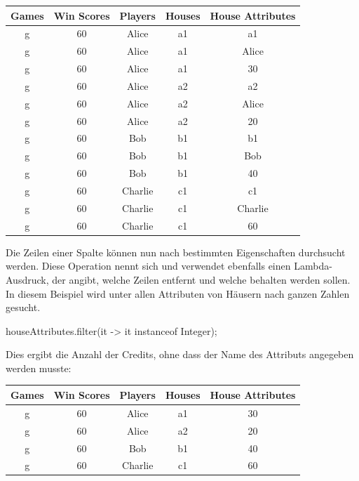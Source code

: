 \begin{tabular}{|c|c|c|c|c|}
    \hline
    \textbf{Games} & \textbf{Win Scores} & \textbf{Players} & \textbf{Houses} & \textbf{House Attributes} \\
    \hline
    g & 60 & Alice   & a1 & a1      \\
    g & 60 & Alice   & a1 & Alice   \\
    g & 60 & Alice   & a1 & 30      \\
    g & 60 & Alice   & a2 & a2      \\
    g & 60 & Alice   & a2 & Alice   \\
    g & 60 & Alice   & a2 & 20      \\
    g & 60 & Bob     & b1 & b1      \\
    g & 60 & Bob     & b1 & Bob     \\
    g & 60 & Bob     & b1 & 40      \\
    g & 60 & Charlie & c1 & c1      \\
    g & 60 & Charlie & c1 & Charlie \\
    g & 60 & Charlie & c1 & 60      \\
    \hline
\end{tabular}

Die Zeilen einer Spalte können nun nach bestimmten Eigenschaften durchsucht werden.
Diese Operation nennt sich  und verwendet ebenfalls einen Lambda-Ausdruck,
der angibt, welche Zeilen entfernt und welche behalten werden sollen.
In diesem Beispiel wird unter allen Attributen von Häusern nach ganzen Zahlen gesucht.

\begin{jcodeblock}
    houseAttributes.filter(it -> it instanceof Integer);
\end{jcodeblock}

Dies ergibt die Anzahl der Credits, ohne dass der Name des Attributs angegeben werden musste:

\begin{tabular}{|c|c|c|c|c|}
    \hline
    \textbf{Games} & \textbf{Win Scores} & \textbf{Players} & \textbf{Houses} & \textbf{House Attributes} \\
    \hline
    g & 60 & Alice   & a1 & 30      \\
    g & 60 & Alice   & a2 & 20      \\
    g & 60 & Bob     & b1 & 40      \\
    g & 60 & Charlie & c1 & 60      \\
    \hline
\end{tabular}

